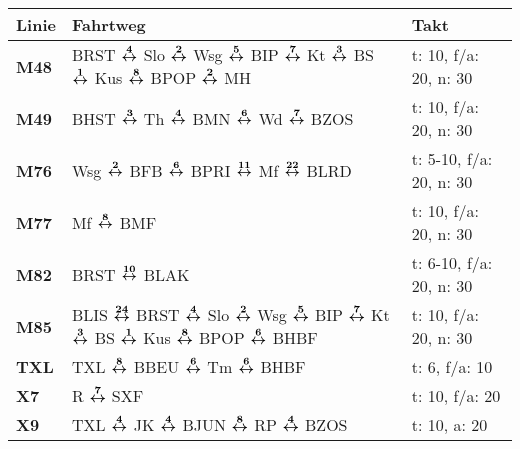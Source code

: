 \begin{minipage}[t]{0.05\textwidth}
\phantom{Tor}
\end{minipage}
\begin{minipage}[t]{0.45\textwidth}
\begin{tabular}{>{\bfseries}L{1.2cm}L{9.0cm}L{3.0cm}}
{\bfseries Linie} & {\bfseries Fahrtweg} & {\bfseries Takt} \\
\hline
\mbus{} M48   & BRST $\xarwe{4}$ Slo $\xarwe{2}$ Wsg $\xarwe{5}$ BIP $\xarwe{7}$ Kt $\xarwe{3}$ BS $\xarwe{1}$ Kus $\xarwe{8}$ BPOP $\xarwe{2}$ MH                                  & t: 10, f/a: 20, n: 30      \\
\mbus{} M49   & BHST $\xarwe{3}$ Th $\xarwe{4}$ BMN $\xarwe{6}$ Wd $\xarwe{7}$ BZOS                                                                                                 & t: 10, f/a: 20, n: 30      \\
\mbus{} M76   & Wsg $\xarwe{2}$ BFB $\xarwe{6}$ BPRI $\xarwe{11}$ Mf $\xarwe{22}$ BLRD                                                                                              & t: 5-10, f/a: 20, n: 30    \\
\mbus{} M77   & Mf $\xarwe{8}$ BMF                                                                                                                                                  & t: 10, f/a: 20, n: 30      \\
\mbus{} M82   & BRST $\xarwe{10}$ BLAK                                                                                                                                              & t: 6-10, f/a: 20, n: 30    \\
\mbus{} M85   & BLIS $\xarwe{24}$ BRST $\xarwe{4}$ Slo $\xarwe{2}$ Wsg $\xarwe{5}$ BIP $\xarwe{7}$ Kt $\xarwe{3}$ BS $\xarwe{1}$ Kus $\xarwe{8}$ BPOP $\xarwe{6}$ BHBF              & t: 10, f/a: 20, n: 30      \\
\xbus{} TXL   & TXL $\xarwe{8}$ BBEU $\xarwe{6}$ Tm $\xarwe{6}$ BHBF                                                                                                                & t: 6, f/a: 10              \\
\xbus{} X7    & R $\xarwe{7}$ SXF                                                                                                                                                   & t: 10, f/a: 20             \\
\xbus{} X9    & TXL $\xarwe{4}$ JK $\xarwe{4}$ BJUN $\xarwe{8}$ RP $\xarwe{4}$ BZOS                                                                                                 & t: 10, a: 20               \\

\end{tabular}
\end{minipage}
